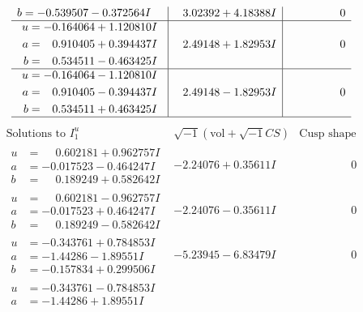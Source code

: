 \documentclass[1p]{elsarticle_modified}
\theoremstyle{definition}
\newcommand{\I}{\sqrt{-1}}
\begin{document}
$$\begin{array}{c|c|c}
\begin{aligned}
b &= -0.539507 - 0.372564 I\end{aligned}
 & \phantom{-}3.02392 + 4.18388 I & \phantom{-0.000000 } 0 \\ \hline\begin{aligned}
u &= -0.164064 + 1.120810 I \\
a &= \phantom{-}0.910405 + 0.394437 I \\
b &= \phantom{-}0.534511 - 0.463425 I\end{aligned}
 & \phantom{-}2.49148 + 1.82953 I & \phantom{-0.000000 } 0 \\ \hline\begin{aligned}
u &= -0.164064 - 1.120810 I \\
a &= \phantom{-}0.910405 - 0.394437 I \\
b &= \phantom{-}0.534511 + 0.463425 I\end{aligned}
 & \phantom{-}2.49148 - 1.82953 I & \phantom{-0.000000 } 0\\
 \hline 
 \end{array}$$\newpage$$\begin{array}{c|c|c}  
\text{Solutions to }I^u_{1}& \I (\text{vol} + \sqrt{-1}CS) & \text{Cusp shape}\\
 \hline 
\begin{aligned}
u &= \phantom{-}0.602181 + 0.962757 I \\
a &= -0.017523 - 0.464247 I \\
b &= \phantom{-}0.189249 + 0.582642 I\end{aligned}
 & -2.24076 + 0.35611 I & \phantom{-0.000000 } 0 \\ \hline\begin{aligned}
u &= \phantom{-}0.602181 - 0.962757 I \\
a &= -0.017523 + 0.464247 I \\
b &= \phantom{-}0.189249 - 0.582642 I\end{aligned}
 & -2.24076 - 0.35611 I & \phantom{-0.000000 } 0 \\ \hline\begin{aligned}
u &= -0.343761 + 0.784853 I \\
a &= -1.44286 - 1.89551 I \\
b &= -0.157834 + 0.299506 I\end{aligned}
 & -5.23945 - 6.83479 I & \phantom{-0.000000 } 0 \\ \hline\begin{aligned}
u &= -0.343761 - 0.784853 I \\
a &= -1.44286 + 1.89551 I \\

\end{aligned}
\end{array}$$
\end{document}
